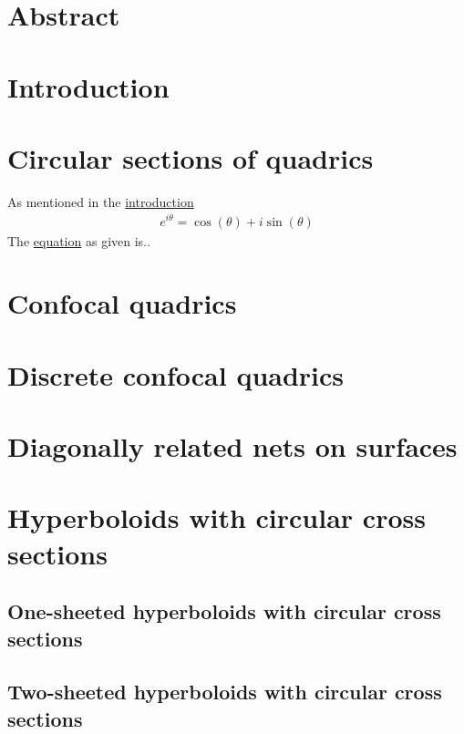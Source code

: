 \documentclass[12pt,a4paper]{article}
\begin{document}
\section*{Abstract}
\pagebreak
\section{Introduction} \label{sec:introduction}
\pagebreak
\section{Circular sections of quadrics}
As mentioned in the \hyperref[sec:introduction]{introduction}
\begin{align} \label{eq:Euler}
    e^{i \theta} = \cos(\theta)+i\sin(\theta)
\end{align}
The \hyperref[eq:Euler]{equation} as given is..
\pagebreak
\section{Confocal quadrics}
\pagebreak
\section{Discrete confocal quadrics}
\pagebreak
\section{Diagonally related nets on surfaces}
\pagebreak
\section{Hyperboloids with circular cross sections}
\subsection{One-sheeted hyperboloids with circular cross sections}
\subsection{Two-sheeted hyperboloids with circular cross sections}
\pagebreak
\end{document}
